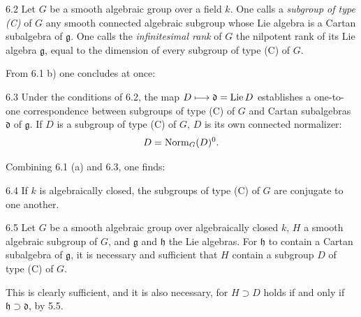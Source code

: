 \begin{definition}{6.2}\label{XIII.6.2}
Let $G$ be a smooth algebraic group over a field $k$.
One calls a \emph{subgroup of type (C)} of $G$ any
smooth connected algebraic subgroup whose Lie algebra
is a Cartan subalgebra of $\mathfrak g$. One calls the
\emph{infinitesimal rank} of $G$ the nilpotent rank of
its Lie algebra $\mathfrak g$, equal to the dimension
of every subgroup of type (C) of $G$.
\end{definition}
From 6.1 b) one concludes at once:

\begin{corollary}{6.3}\label{XIII.6.3}
Under the conditions of 6.2, the map
$D\longmapsto\mathfrak d=\operatorname{Lie} D$ establishes a one-to-one
correspondence between subgroups of type (C) of $G$
and Cartan subalgebras $\mathfrak d$ of $\mathfrak g$.
If $D$ is a subgroup of type (C) of $G$, $D$ is its
own connected normalizer:
\[
 D=\operatorname{Norm}_G(D)^0.
\]
\end{corollary}
Combining 6.1 (a) and 6.3, one finds:

\begin{corollary}{6.4}\label{XIII.6.4}
If $k$ is algebraically closed, the subgroups of type
(C) of $G$ are conjugate to one another.
\end{corollary}

\begin{corollary}{6.5}\label{XIII.6.5}
Let $G$ be a smooth algebraic group over algebraically
closed $k$, $H$ a smooth algebraic subgroup of $G$,
and $\mathfrak g$ and $\mathfrak h$ the Lie algebras.
For $\mathfrak h$ to contain a Cartan subalgebra of
$\mathfrak g$, it is necessary and sufficient that $H$
contain a subgroup $D$ of type (C) of $G$.
\end{corollary}
This is clearly sufficient, and it is also necessary,
for $H\supset D$ holds if and only if
$\mathfrak h\supset\mathfrak d$, by 5.5.

